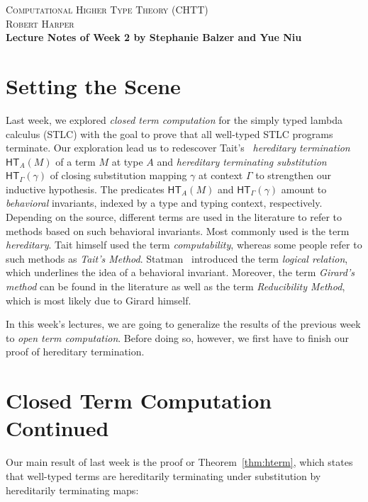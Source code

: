 \documentclass{article}
\newcommand{\hterm}[2]{\ensuremath{\mathsf{HT}_{#1}(#2)}}
\begin{document}
\begin{center}
\Large{\scshape Computational Higher Type Theory (CHTT)}\\[2pt]
\large{\scshape Robert Harper}\\[4pt]
\large\bfseries{Lecture Notes of Week 2 by Stephanie Balzer and Yue Niu}
\end{center}

\bigskip

\section{Setting the Scene}

Last week, we explored \emph{closed term computation} for the simply typed lambda calculus
(STLC) with the goal to prove that all well-typed STLC programs terminate.  Our exploration
lead us to redescover Tait's~\citeyear{Tait:67} \emph{hereditary termination} $\hterm{A}{M}$ of
a term $M$ at type $A$ and \emph{hereditary terminating substitution} $\hterm{\Gamma}{\gamma}$
of closing substitution mapping $\gamma$ at context $\Gamma$ to strengthen our inductive
hypothesis.  The predicates $\hterm{A}{M}$ and $\hterm{\Gamma}{\gamma}$ amount to
\emph{behavioral} invariants, indexed by a type and typing context, respectively.  Depending on
the source, different terms are used in the literature to refer to methods based on such
behavioral invariants.  Most commonly used is the term \emph{hereditary}.  Tait himself used
the term \emph{computability}, whereas some people refer to such methods as \emph{Tait's
  Method}.  Statman~\citeyear{Statman:85} introduced the term \emph{logical relation}, which
underlines the idea of a behavioral invariant.  Moreover, the term \emph{Girard's method} can
be found in the literature as well as the term \emph{Reducibility Method}, which is most likely
due to Girard himself.

In this week's lectures, we are going to generalize the results of the previous week to
\emph{open term computation}.  Before doing so, however, we first have to finish our proof of
hereditary termination.

\section{Closed Term Computation Continued}

Our main result of last week is the proof or Theorem~\ref{thm:hterm}, which states that well-typed terms are hereditarily terminating under substitution by 
hereditarily terminating maps:
\end{document}
